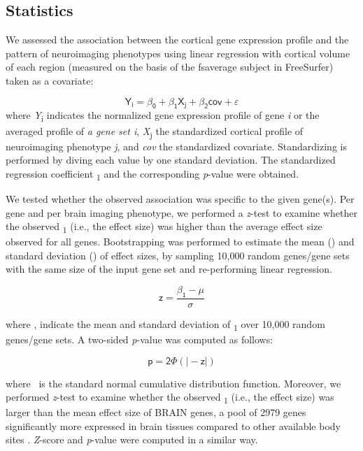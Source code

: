 \begin{refsection}
\subsection*{Statistics}
We assessed the association between the cortical gene expression profile and the pattern of neuroimaging phenotypes using linear regression with cortical volume of each region (measured on the basis of the fsaverage subject in FreeSurfer) taken as a covariate:

\[
\mathsf{ Y_{i}= \beta_{0}+ \beta_{1}X_{j}+ \beta _{2}cov+ \varepsilon } 
\] 
\noindent
where \textit{Y}\textsubscript{i} indicates the normalized gene expression profile of gene \textit{i} or the averaged profile of\textit{ a gene set i}, \textit{X}\textsubscript{j} the standardized cortical profile of neuroimaging phenotype \textit{j}, and \textit{cov} the standardized covariate. Standardizing is performed by diving each value by one standard deviation. The standardized regression coefficient \textbeta\textsubscript{1} and the corresponding \textit{p}-value were obtained.

We tested whether the observed association was specific to the given gene(s). Per gene and per brain imaging phenotype, we performed a \textit{z}-test to examine whether the observed \textbeta\textsubscript{1} (i.e., the effect size) was higher than the average effect size observed for all genes. Bootstrapping was performed to estimate the mean (\textmu) and standard deviation (\textsigma) of effect sizes, by sampling 10,000 random genes/gene sets with the same size of the input gene set and re-performing linear regression. 

\[ \mathsf{ z=\frac{ \beta _{1}-  \mu }{ \sigma } } \]

\noindent
where \textmu, \textsigma indicate the mean and standard deviation of \textbeta\textsubscript{1} over 10,000 random genes/gene sets. A two-sided \textit{p}-value was computed as follows:

 \[  \mathsf{p=2 \Phi  \left(  \vert -z \vert  \right)}  \]

where \textPhi \  is the standard normal cumulative distribution function. Moreover, we performed \textit{z}-test to examine whether the observed \textbeta\textsubscript{1} (i.e., the effect size) was larger than the mean effect size of BRAIN genes, a pool of 2979 genes significantly more expressed in brain tissues compared to other available body sites \citep{Wei2019GeneticMA}. \textit{Z}-score and \textit{p}-value were computed in a similar way.


\end{refsection}
